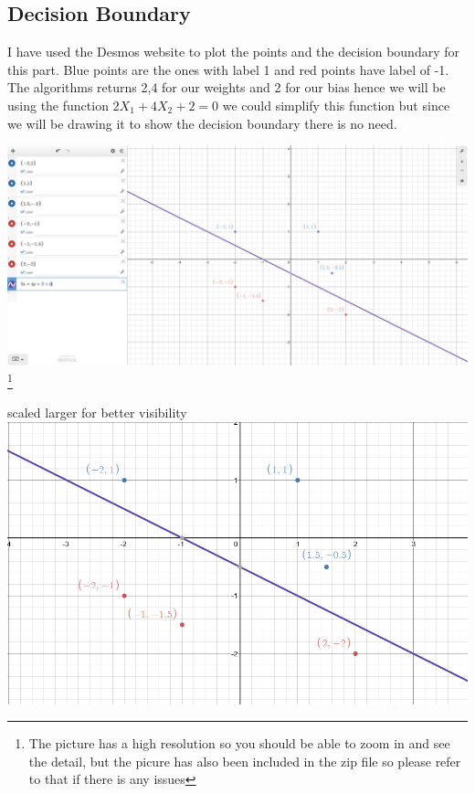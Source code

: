 \documentclass{article}
\begin{document}
	\subsection{Decision Boundary}
	I have used the Desmos website to plot the points and the decision boundary for this part. Blue points are the ones with label 1 and red points have label of -1.
	The algorithms returns 2,4 for our weights and 2 for our bias hence we will be  using the function
	$2X_1 + 4X_2 + 2 = 0$ we could simplify this function but since we will be drawing it to show the decision boundary there is no need.
	\begin{center}
		\includegraphics[scale=.24]{DB.png}
		\footnote{The picture has a high resolution so you should be able to zoom in and see the detail, but the picure has also been included in the zip file so please refer to that if there is any issues}
	\end{center}
	\begin{center}
	scaled larger for better visibility
	\includegraphics[scale=.65]{DB2.png}
\end{center}
\end{document}
